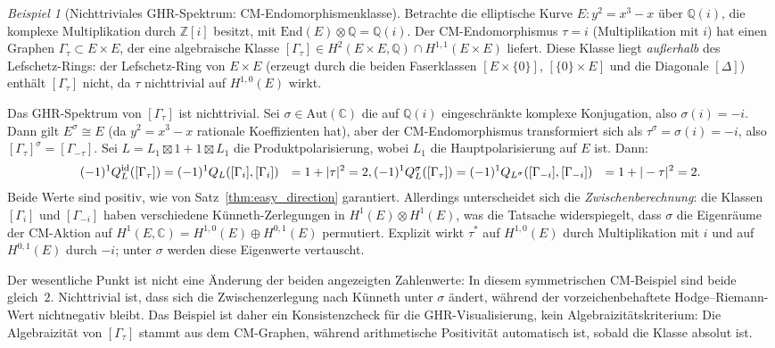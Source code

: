 \documentclass[aps,prd,twocolumn,superscriptaddress,nofootinbib]{revtex4-2}
\theoremstyle{definition}
\theoremstyle{remark}
\newtheorem{example}[theorem]{Beispiel}
\def\\{ }%
\begin{document}
\begin{example}[Nichttriviales GHR-Spektrum: CM-Endomorphismenklasse]
\label{ex:cm_endomorphism}
Betrachte die elliptische Kurve $E: y^2 = x^3 - x$ über $\mathbb{Q}(i)$, die komplexe Multiplikation durch $\mathbb{Z}[i]$ besitzt, mit $\mathrm{End}(E) \otimes \mathbb{Q} = \mathbb{Q}(i)$. Der CM-Endomorphismus $\tau = i$ (Multiplikation mit $i$) hat einen Graphen $\Gamma_\tau \subset E \times E$, der eine algebraische Klasse $[\Gamma_\tau] \in H^2(E \times E, \mathbb{Q}) \cap H^{1,1}(E \times E)$ liefert. Diese Klasse liegt \emph{außerhalb} des Lefschetz-Rings: der Lefschetz-Ring von $E \times E$ (erzeugt durch die beiden Faserklassen $[E \times \{0\}]$, $[\{0\} \times E]$ und die Diagonale $[\Delta]$) enthält $[\Gamma_\tau]$ nicht, da $\tau$ nichttrivial auf $H^{1,0}(E)$ wirkt.

Das GHR-Spektrum von $[\Gamma_\tau]$ ist nichttrivial. Sei $\sigma \in \mathrm{Aut}(\mathbb{C})$ die auf $\mathbb{Q}(i)$ eingeschränkte komplexe Konjugation, also $\sigma(i) = -i$. Dann gilt $E^\sigma \cong E$ (da $y^2 = x^3 - x$ rationale Koeffizienten hat), aber der CM-Endomorphismus transformiert sich als $\tau^\sigma = \sigma(i) = -i$, also $[\Gamma_\tau]^\sigma = [\Gamma_{-\tau}]$. Sei $L = L_1 \boxtimes 1 + 1 \boxtimes L_1$ die Produktpolarisierung, wobei $L_1$ die Hauptpolarisierung auf $E$ ist. Dann:
\begin{align}
(-1)^1 Q_L^\mathrm{id}([\Gamma_\tau])
&= (-1)^1 Q_L([\Gamma_i], [\Gamma_i]) \notag\\
&= 1 + |\tau|^2 = 2, \label{eq:cm_id}\\
(-1)^1 Q_L^\sigma([\Gamma_\tau])
&= (-1)^1 Q_{L^\sigma}([\Gamma_{-i}], [\Gamma_{-i}]) \notag\\
&= 1 + |-\tau|^2 = 2. \label{eq:cm_sigma}
\end{align}
Beide Werte sind positiv, wie von Satz~\ref{thm:easy_direction} garantiert. Allerdings unterscheidet sich die \emph{Zwischenberechnung}: die Klassen $[\Gamma_i]$ und $[\Gamma_{-i}]$ haben verschiedene Künneth-Zerlegungen in $H^1(E) \otimes H^1(E)$, was die Tatsache widerspiegelt, dass $\sigma$ die Eigenräume der CM-Aktion auf $H^1(E, \mathbb{C}) = H^{1,0}(E) \oplus H^{0,1}(E)$ permutiert. Explizit wirkt $\tau^*$ auf $H^{1,0}(E)$ durch Multiplikation mit $i$ und auf $H^{0,1}(E)$ durch $-i$; unter $\sigma$ werden diese Eigenwerte vertauscht.

Der wesentliche Punkt ist nicht eine Änderung der beiden angezeigten Zahlenwerte: In diesem symmetrischen CM-Beispiel sind beide gleich~$2$. Nichttrivial ist, dass sich die Zwischenzerlegung nach Künneth unter $\sigma$ ändert, während der vorzeichenbehaftete Hodge--Riemann-Wert nichtnegativ bleibt. Das Beispiel ist daher ein Konsistenzcheck für die GHR-Visualisierung, kein Algebraizitätskriterium: Die Algebraizität von $[\Gamma_\tau]$ stammt aus dem CM-Graphen, während arithmetische Positivität automatisch ist, sobald die Klasse absolut ist.
\end{example}
\end{document}
